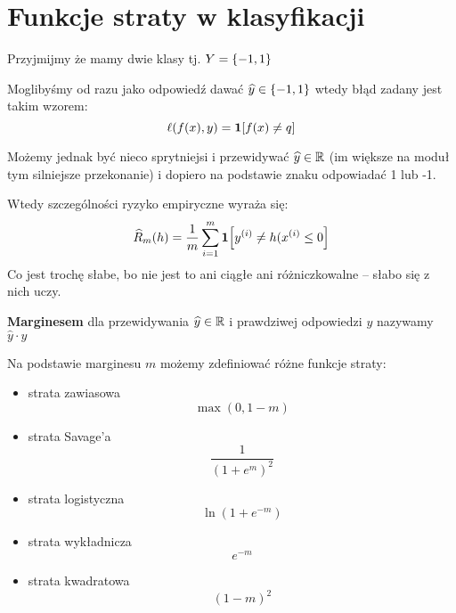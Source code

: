 \section{Funkcje straty w klasyfikacji}
Przyjmijmy że mamy dwie klasy tj. \( Y = \set{-1, 1} \)

Moglibyśmy od razu jako odpowiedź dawać \( \widehat y \in \set{-1, 1}\)
wtedy błąd zadany jest takim wzorem:
\[
    \ell(f(x), y) = \indicator{f(x) \neq q}
\]

Możemy jednak być nieco sprytniejsi i przewidywać \( \widehat y \in \mathbb{R} \) (im większe na moduł tym silniejsze przekonanie) i dopiero na podstawie znaku odpowiadać 1 lub -1.

Wtedy szczególności ryzyko empiryczne wyraża się:
\[
    \widehat R_m(h) = \frac{1}{m} \sum_{i=1}^m \indicator{y^{(i)} \neq h(x^{(i)} \leq 0}
\]
Co jest trochę słabe, bo nie jest to ani ciągłe ani różniczkowalne -- słabo się z nich uczy.

\begin{definition}
    \textbf{Marginesem} dla przewidywania \( \widehat y \in \mathbb{R} \) i prawdziwej odpowiedzi \( y \) nazywamy \( \widehat y \cdot y \)
\end{definition}

Na podstawie marginesu \( m \) możemy zdefiniować różne funkcje straty:
\begin{itemize}
    \item strata zawiasowa
    \[
        \max(0, 1 - m)
    \]
    \item strata Savage'a
    \[
        \frac{1}{(1 + e^m)^2}
    \]
    \item strata logistyczna
    \[
        \ln(1 + e^{-m})
    \]
    \item strata wykładnicza
    \[
        e^{-m}
    \]
    \item strata kwadratowa
    \[
        (1 - m)^2
    \]
    
\end{itemize}